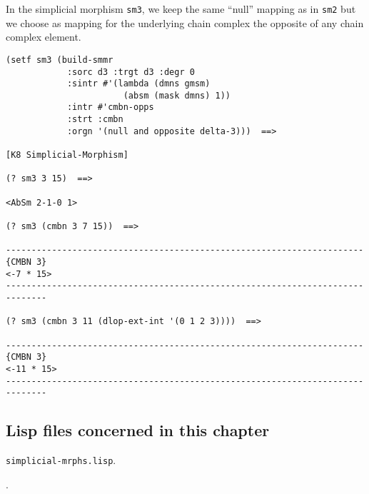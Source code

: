 In the simplicial morphism {\tt sm3}, we keep the same ``null'' mapping as in {\tt sm2}
but we choose as mapping for the underlying chain complex the opposite of any chain complex 
element.
{\footnotesize\begin{verbatim}
(setf sm3 (build-smmr
            :sorc d3 :trgt d3 :degr 0
            :sintr #'(lambda (dmns gmsm)
                       (absm (mask dmns) 1))
            :intr #'cmbn-opps
            :strt :cmbn
            :orgn '(null and opposite delta-3)))  ==>

[K8 Simplicial-Morphism]

(? sm3 3 15)  ==>

<AbSm 2-1-0 1>

(? sm3 (cmbn 3 7 15))  ==>

----------------------------------------------------------------------{CMBN 3}
<-7 * 15>
------------------------------------------------------------------------------

(? sm3 (cmbn 3 11 (dlop-ext-int '(0 1 2 3))))  ==>

----------------------------------------------------------------------{CMBN 3}
<-11 * 15>
------------------------------------------------------------------------------
\end{verbatim}}

\subsection* {Lisp files concerned in this chapter}

{\tt simplicial-mrphs.lisp}.
\par
[{\tt classes.lisp}, {\tt macros.lisp}, {\tt various.lisp}].
